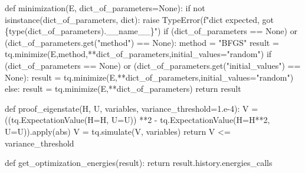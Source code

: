 \documentclass[
  letterpaper,
  DIV=11,
  numbers=noendperiod]{scrartcl}
\newenvironment{Shaded}{\begin{snugshade}}{\end{snugshade}}
\newcommand{\BuiltInTok}[1]{\textcolor[rgb]{0.00,0.23,0.31}{#1}}
\newcommand{\ControlFlowTok}[1]{\textcolor[rgb]{0.00,0.23,0.31}{#1}}
\newcommand{\DecValTok}[1]{\textcolor[rgb]{0.68,0.00,0.00}{#1}}
\newcommand{\FloatTok}[1]{\textcolor[rgb]{0.68,0.00,0.00}{#1}}
\newcommand{\KeywordTok}[1]{\textcolor[rgb]{0.00,0.23,0.31}{#1}}
\newcommand{\NormalTok}[1]{\textcolor[rgb]{0.00,0.23,0.31}{#1}}
\newcommand{\OperatorTok}[1]{\textcolor[rgb]{0.37,0.37,0.37}{#1}}
\newcommand{\PreprocessorTok}[1]{\textcolor[rgb]{0.68,0.00,0.00}{#1}}
\newcommand{\SpecialCharTok}[1]{\textcolor[rgb]{0.37,0.37,0.37}{#1}}
\newcommand{\SpecialStringTok}[1]{\textcolor[rgb]{0.13,0.47,0.30}{#1}}
\newcommand{\StringTok}[1]{\textcolor[rgb]{0.13,0.47,0.30}{#1}}
\newcommand{\VariableTok}[1]{\textcolor[rgb]{0.07,0.07,0.07}{#1}}
\begin{document}
\begin{Shaded}
\begin{Highlighting}[]
    \KeywordTok{def}\NormalTok{ minimization(E, dict\_of\_parameters}\OperatorTok{=}\VariableTok{None}\NormalTok{):}
        \ControlFlowTok{if} \KeywordTok{not} \BuiltInTok{isinstance}\NormalTok{(dict\_of\_parameters, }\BuiltInTok{dict}\NormalTok{):}
            \ControlFlowTok{raise} \PreprocessorTok{TypeError}\NormalTok{(}\SpecialStringTok{f"dict expected, got \textquotesingle{}}\SpecialCharTok{\{}\BuiltInTok{type}\NormalTok{(dict\_of\_parameters)}\SpecialCharTok{.}\VariableTok{\_\_name\_\_}\SpecialCharTok{\}}\SpecialStringTok{\textquotesingle{}"}\NormalTok{)}
        \ControlFlowTok{if}\NormalTok{ (dict\_of\_parameters }\OperatorTok{==} \VariableTok{None}\NormalTok{) }\KeywordTok{or}\NormalTok{ (dict\_of\_parameters.get(}\StringTok{"method"}\NormalTok{) }\OperatorTok{==} \VariableTok{None}\NormalTok{):}
\NormalTok{            method }\OperatorTok{=} \StringTok{"BFGS"}
\NormalTok{            result }\OperatorTok{=}\NormalTok{ tq.minimize(E,method,}\OperatorTok{**}\NormalTok{dict\_of\_parameters,initial\_values}\OperatorTok{=}\StringTok{"random"}\NormalTok{)}
        \ControlFlowTok{if}\NormalTok{ (dict\_of\_parameters }\OperatorTok{==} \VariableTok{None}\NormalTok{) }\KeywordTok{or}\NormalTok{ (dict\_of\_parameters.get(}\StringTok{"initial\_values"}\NormalTok{) }\OperatorTok{==} \VariableTok{None}\NormalTok{):}
\NormalTok{            result }\OperatorTok{=}\NormalTok{ tq.minimize(E,}\OperatorTok{**}\NormalTok{dict\_of\_parameters,initial\_values}\OperatorTok{=}\StringTok{"random"}\NormalTok{)}
        \ControlFlowTok{else}\NormalTok{:}
\NormalTok{            result }\OperatorTok{=}\NormalTok{ tq.minimize(E,}\OperatorTok{**}\NormalTok{dict\_of\_parameters)}
        \ControlFlowTok{return}\NormalTok{ result}
    
    
    \KeywordTok{def}\NormalTok{ proof\_eigenstate(H, U, variables, variance\_threshold}\OperatorTok{=}\FloatTok{1.e{-}4}\NormalTok{):}
\NormalTok{        V }\OperatorTok{=}\NormalTok{ ((tq.ExpectationValue(H}\OperatorTok{=}\NormalTok{H, U}\OperatorTok{=}\NormalTok{U))  }\OperatorTok{**}\DecValTok{2} \OperatorTok{{-}}\NormalTok{ tq.ExpectationValue(H}\OperatorTok{=}\NormalTok{H}\OperatorTok{**}\DecValTok{2}\NormalTok{, U}\OperatorTok{=}\NormalTok{U)).}\BuiltInTok{apply}\NormalTok{(}\BuiltInTok{abs}\NormalTok{)}
\NormalTok{        V }\OperatorTok{=}\NormalTok{ tq.simulate(V, variables)}
        \ControlFlowTok{return}\NormalTok{ V }\OperatorTok{\textless{}=}\NormalTok{ variance\_threshold}
    
    \KeywordTok{def}\NormalTok{ get\_optimization\_energies(result):}
        \ControlFlowTok{return}\NormalTok{ result.history.energies\_calls}


\end{Highlighting}
\end{Shaded}
\end{document}
